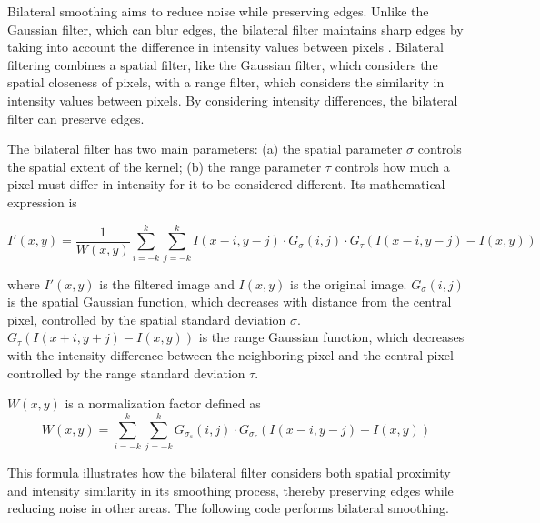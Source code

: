 \documentclass[
  shortnames]{jss}
\begin{document}
Bilateral smoothing aims to reduce noise while preserving edges. Unlike the Gaussian filter, which can blur edges, the bilateral filter maintains sharp edges by taking into account the difference in intensity values between pixels \citep{Tomasi1998}. Bilateral filtering combines a spatial filter, like the Gaussian filter, which considers the spatial closeness of pixels, with a range filter, which considers the similarity in intensity values between pixels. By considering intensity differences, the bilateral filter can preserve edges.

The bilateral filter has two main parameters: (a) the spatial parameter \(\sigma\) controls the spatial extent of the kernel; (b) the range parameter \(\tau\) controls how much a pixel must differ in intensity for it to be considered different. Its mathematical expression is

\begin{equation}
I'(x, y) = \frac{1}{W(x, y)} \sum_{i=-k}^{k} \sum_{j=-k}^{k} I(x - i, y - j) \cdot G_{\sigma}(i, j) \cdot G_{\tau}(I(x - i, y - j) - I(x, y))
\end{equation}

where \(I'(x,y)\) is the filtered image and \(I(x,y)\) is the original image. \(G_{\sigma}(i, j)\) is the spatial Gaussian function, which decreases with distance from the central pixel, controlled by the spatial standard deviation \(\sigma\). \(G_{\tau}(I(x + i, y + j) - I(x, y))\) is the range Gaussian function, which decreases with the intensity difference between the neighboring pixel and the central pixel controlled by the range standard deviation \(\tau\).

\(W(x, y)\) is a normalization factor defined as
\begin{equation}
W(x, y) = \sum_{i=-k}^{k} \sum_{j=-k}^{k} G_{\sigma_s}(i, j) \cdot G_{\sigma_r}(I(x - i, y - j) - I(x, y))
\end{equation}

This formula illustrates how the bilateral filter considers both spatial proximity and intensity similarity in its smoothing process, thereby preserving edges while reducing noise in other areas. The following code performs bilateral smoothing.
\end{document}
